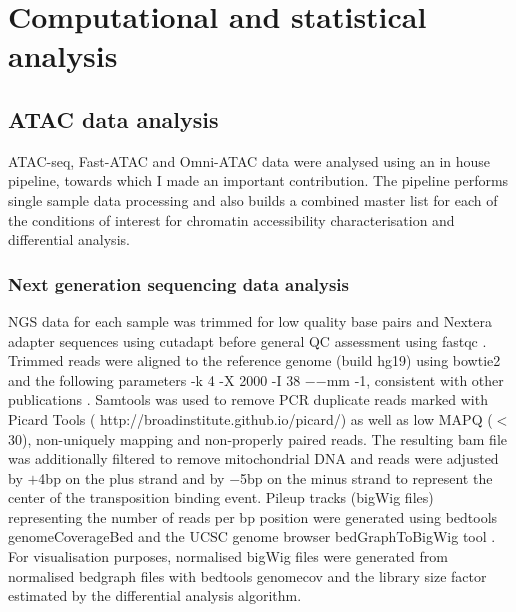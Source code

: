 \section{Computational and statistical analysis}

\subsection{ATAC data analysis}
\label{ATAC_analysis}
ATAC-seq, Fast-ATAC and Omni-ATAC data were analysed using an in house pipeline, towards which I made an important contribution. The pipeline performs single sample data processing and also builds a combined master list for each of the conditions of interest for chromatin accessibility characterisation and differential analysis. 

\subsubsection{Next generation sequencing data analysis}
NGS data for each sample was trimmed for low quality base pairs and Nextera adapter sequences using cutadapt \parencite{Martin2011} before general QC assessment using fastqc \parencite{Andrews2010}. Trimmed reads were aligned to the reference genome (build hg19) using bowtie2 \parencite{Langmead2006} and the following parameters -k 4 -X 2000 -I 38 $-$$-$mm -1, consistent with other publications \parencite{Buenrostro2013, Corces2016}. Samtools \parencite{Li2009} was used to remove PCR duplicate reads marked with Picard Tools ( http://broadinstitute.github.io/picard/) as well as low MAPQ (${<}$30), non-uniquely mapping and non-properly paired reads. The resulting bam file was additionally filtered to remove mitochondrial DNA and reads were adjusted by $+$4bp on the plus strand and by $-$5bp on the minus strand to represent the center of the transposition binding event. Pileup tracks (bigWig files) representing the number of reads per bp position were generated using bedtools genomeCoverageBed \parencite{Quinlan2010} and the UCSC genome browser bedGraphToBigWig tool \parencite{Kent2010}. For visualisation purposes, normalised bigWig files were generated from normalised bedgraph files with bedtools genomecov and the library size factor estimated by the differential analysis algorithm. 

